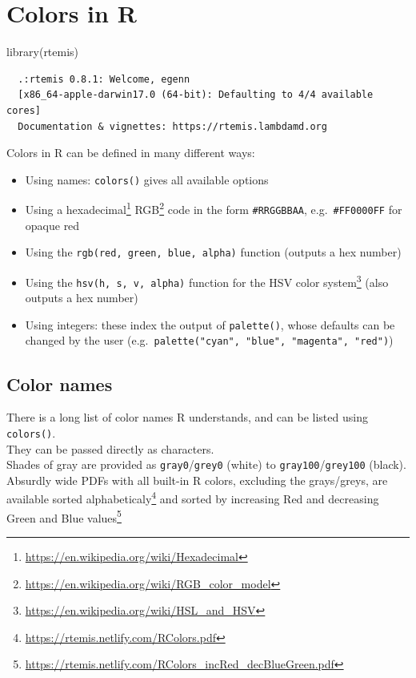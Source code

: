 \documentclass[
]{book}
\newenvironment{Shaded}{\begin{snugshade}}{\end{snugshade}}
\newcommand{\FunctionTok}[1]{\textcolor[rgb]{0.00,0.00,0.00}{#1}}
\newcommand{\NormalTok}[1]{#1}
\DeclareRobustCommand{\href}[2]{#2\footnote{\url{#1}}}
\providecommand{\tightlist}{%
  \setlength{\itemsep}{0pt}\setlength{\parskip}{0pt}}
\begin{document}
\hypertarget{colors}{%
\chapter{Colors in R}\label{colors}}

\begin{Shaded}
\begin{Highlighting}[]
\FunctionTok{library}\NormalTok{(rtemis)}
\end{Highlighting}
\end{Shaded}

\begin{verbatim}
  .:rtemis 0.8.1: Welcome, egenn
  [x86_64-apple-darwin17.0 (64-bit): Defaulting to 4/4 available cores]
  Documentation & vignettes: https://rtemis.lambdamd.org
\end{verbatim}

Colors in R can be defined in many different ways:

\begin{itemize}
\tightlist
\item
  Using names: \texttt{colors()} gives all available options
\item
  Using a \href{https://en.wikipedia.org/wiki/Hexadecimal}{hexadecimal} \href{https://en.wikipedia.org/wiki/RGB_color_model}{RGB} code in the form \texttt{\#RRGGBBAA}, e.g.~\texttt{\#FF0000FF} for opaque red
\item
  Using the \texttt{rgb(red,\ green,\ blue,\ alpha)} function (outputs a hex number)
\item
  Using the \texttt{hsv(h,\ s,\ v,\ alpha)} function for the \href{https://en.wikipedia.org/wiki/HSL_and_HSV}{HSV color system} (also outputs a hex number)
\item
  Using integers: these index the output of \texttt{palette()}, whose defaults can be changed by the user (e.g.~\texttt{palette("cyan",\ "blue",\ "magenta",\ "red")})
\end{itemize}

\hypertarget{color-names}{%
\section{Color names}\label{color-names}}

There is a long list of color names R understands, and can be listed using \texttt{colors()}.\\
They can be passed directly as characters.\\
Shades of gray are provided as \texttt{gray0}/\texttt{grey0} (white) to \texttt{gray100}/\texttt{grey100} (black).\\
Absurdly wide PDFs with all built-in R colors, excluding the grays/greys, are available sorted \href{https://rtemis.netlify.com/RColors.pdf}{alphabeticaly} and sorted by \href{https://rtemis.netlify.com/RColors_incRed_decBlueGreen.pdf}{increasing Red and decreasing Green and Blue values}
\end{document}
